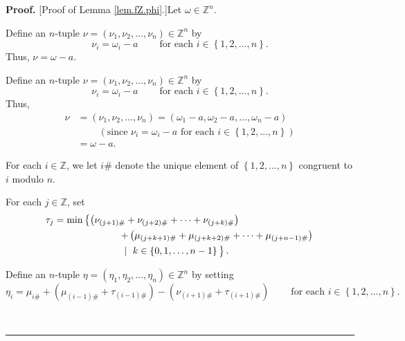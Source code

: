 \documentclass[numbers=enddot,12pt,final,onecolumn,notitlepage]{scrartcl}%
\theoremstyle{definition}
\newenvironment{proof}[1][Proof]{\noindent\textbf{#1.} }{\ \rule{0.5em}{0.5em}}
\newenvironment{verlong}{}{}
\newenvironment{vershort}{}{}
\begin{document}
\begin{proof}
[Proof of Lemma \ref{lem.fZ.phi}.]Let $\omega\in\mathbb{Z}^{n}$.

\begin{vershort}
Define an $n$-tuple $\nu=\left(  \nu_{1},\nu_{2},\ldots,\nu_{n}\right)
\in\mathbb{Z}^{n}$ by
\[
\nu_{i}=\omega_{i}-a\ \ \ \ \ \ \ \ \ \ \text{for each }i\in\left\{
1,2,\ldots,n\right\}  .
\]
Thus, $\nu=\omega-a$.
\end{vershort}

\begin{verlong}
Define an $n$-tuple $\nu=\left(  \nu_{1},\nu_{2},\ldots,\nu_{n}\right)
\in\mathbb{Z}^{n}$ by%
\[
\nu_{i}=\omega_{i}-a\ \ \ \ \ \ \ \ \ \ \text{for each }i\in\left\{
1,2,\ldots,n\right\}  .
\]
Thus,%
\begin{align*}
\nu &  =\left(  \nu_{1},\nu_{2},\ldots,\nu_{n}\right)  =\left(  \omega
_{1}-a,\omega_{2}-a,\ldots,\omega_{n}-a\right)  \\
&  \ \ \ \ \ \ \ \ \ \ \left(  \text{since }\nu_{i}=\omega_{i}-a\text{ for
each }i\in\left\{  1,2,\ldots,n\right\}  \right)  \\
&  =\omega-a.
\end{align*}

\end{verlong}

For each $i\in\mathbb{Z}$, we let $i\#$ denote the unique element of $\left\{
1,2,\ldots,n\right\}  $ congruent to $i$ modulo $n$.

For each $j\in\mathbb{Z}$, set%
\begin{align}
\tau_{j}  &  =\min\left\{  \left(  \nu_{\left(  j+1\right)  \#}+\nu_{\left(
j+2\right)  \#}+\cdots+\nu_{\left(  j+k\right)  \#}\right)  \right.
\nonumber\\
&  \ \ \ \ \ \ \ \ \ \ \ \ \ \ \ \ \ \ \ \ \left.  +\left(  \mu_{\left(
j+k+1\right)  \#}+\mu_{\left(  j+k+2\right)  \#}+\cdots+\mu_{\left(
j+n-1\right)  \#}\right)  \right. \nonumber\\
&  \ \ \ \ \ \ \ \ \ \ \ \ \ \ \ \ \ \ \ \ \left.  \ \mid\ k\in\left\{
0,1,\ldots,n-1\right\}
\vphantom{\left(\nu_{\left(j+1\right)\#}\right)}\right\}  .
\label{pf.lem.fZ.phi.tauj=}%
\end{align}


Define an $n$-tuple $\eta=\left(  \eta_{1},\eta_{2},\ldots,\eta_{n}\right)
\in\mathbb{Z}^{n}$ by setting%
\[
\eta_{i}=\mu_{i\#}+\left(  \mu_{\left(  i-1\right)  \#}+\tau_{\left(
i-1\right)  \#}\right)  -\left(  \nu_{\left(  i+1\right)  \#}+\tau_{\left(
i+1\right)  \#}\right)  \ \ \ \ \ \ \ \ \ \ \text{for each }i\in\left\{
1,2,\ldots,n\right\}  .
\]



\end{proof}
\end{document}
